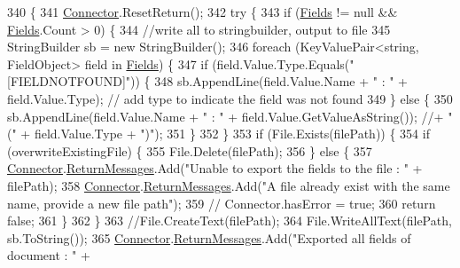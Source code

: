 \begin{DoxyCode}
340                                                                           \{
341         \hyperlink{class_connector}{Connector}.ResetReturn();
342         \textcolor{keywordflow}{try} \{
343             \textcolor{keywordflow}{if} (\hyperlink{class_document_object_ae203b8a3e40b6c428145d2335b71245c}{Fields} != null && \hyperlink{class_document_object_ae203b8a3e40b6c428145d2335b71245c}{Fields}.Count > 0) \{
344                 \textcolor{comment}{//write all to stringbuilder, output to file }
345                 StringBuilder sb = \textcolor{keyword}{new} StringBuilder();
346                 \textcolor{keywordflow}{foreach} (KeyValuePair<string, FieldObject> field \textcolor{keywordflow}{in} \hyperlink{class_document_object_ae203b8a3e40b6c428145d2335b71245c}{Fields}) \{
347                     \textcolor{keywordflow}{if} (field.Value.Type.Equals(\textcolor{stringliteral}{"[FIELDNOTFOUND]"})) \{
348                         sb.AppendLine(field.Value.Name + \textcolor{stringliteral}{" : "} + field.Value.Type); \textcolor{comment}{// add type to indicate
       the field was not found}
349                     \} \textcolor{keywordflow}{else} \{
350                         sb.AppendLine(field.Value.Name + \textcolor{stringliteral}{" : "} + field.Value.GetValueAsString()); \textcolor{comment}{//+ " ("
       + field.Value.Type + ")");}
351                     \}
352                 \}
353                 \textcolor{keywordflow}{if} (File.Exists(filePath)) \{
354                     \textcolor{keywordflow}{if} (overwriteExistingFile) \{
355                         File.Delete(filePath);
356                     \} \textcolor{keywordflow}{else} \{
357                         \hyperlink{class_connector}{Connector}.\hyperlink{class_connector_a1ed422674b344524fd77998dcf6a9ba6}{ReturnMessages}.Add(\textcolor{stringliteral}{"Unable to export the fields to
       the file : "} + filePath);
358                         \hyperlink{class_connector}{Connector}.\hyperlink{class_connector_a1ed422674b344524fd77998dcf6a9ba6}{ReturnMessages}.Add(\textcolor{stringliteral}{"A file already exist with the
       same name, provide a new file path"});
359                         \textcolor{comment}{// Connector.hasError = true;}
360                         \textcolor{keywordflow}{return} \textcolor{keyword}{false};
361                     \}
362                 \}
363                 \textcolor{comment}{//File.CreateText(filePath);}
364                 File.WriteAllText(filePath, sb.ToString());
365                 \hyperlink{class_connector}{Connector}.\hyperlink{class_connector_a1ed422674b344524fd77998dcf6a9ba6}{ReturnMessages}.Add(\textcolor{stringliteral}{"Exported all fields of document : "} + 

\end{DoxyCode}
